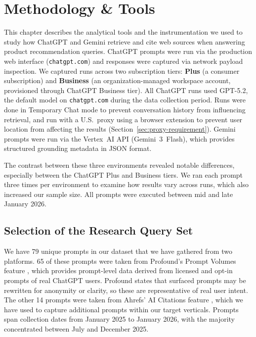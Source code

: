 \chapter{Methodology \& Tools}
\label{ch:methodology}

This chapter describes the analytical tools and the instrumentation we used to study how ChatGPT and Gemini retrieve and cite web sources when answering product recommendation queries. ChatGPT prompts were run via the production web interface (\texttt{chatgpt.com}) and responses were captured via network payload inspection. We captured runs across two subscription tiers: \textbf{Plus} (a consumer subscription) and \textbf{Business} (an organization-managed workspace account, provisioned through ChatGPT Business tier). 
All ChatGPT runs used GPT-5.2, the default model on \texttt{chatgpt.com} during the data collection period. Runs were done in Temporary Chat mode to prevent conversation history from 
influencing retrieval, and run with a U.S.\ proxy using a browser extension to prevent user location from affecting the results (Section~\ref{sec:proxy-requirement}). Gemini prompts were run via the Vertex~AI API (Gemini~3~Flash), which provides structured grounding metadata in JSON format.

The contrast between these three environments revealed notable differences, especially between the ChatGPT Plus and Business tiers. We ran each prompt three times per environment to examine how results vary across runs, which also increased our sample size. All prompts were executed between mid and late January 2026.

\section{Selection of the Research Query Set}
\label{sec:query-set-selection}

We have 79 unique prompts in our dataset that we have gathered from two platforms. 65 of these prompts were taken from Profound's Prompt Volumes feature \parencite{profound2026promptvolumes}, which provides prompt-level data derived from licensed and opt-in prompts of real ChatGPT users. Profound states that surfaced prompts may be rewritten for anonymity or clarity, so these are representative of real user intent. The other 14 prompts were taken from Ahrefs' AI Citations feature \parencite{ahrefs2025aicitations}, which we have used to capture additional prompts within our target verticals. Prompts span collection dates from January 2025 to January 2026, with the majority concentrated between July and December 2025.

